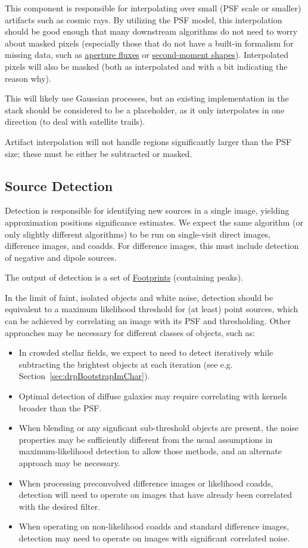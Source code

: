This component is responsible for interpolating over small (PSF scale or smaller) artifacts such as cosmic rays.  By utilizing the PSF model, this interpolation should be good enough that many downstream algorithms do not need to worry about masked pixels (especially those that do not have a built-in formalism for missing data, such as \hyperref[sec:acAperturePhotometry]{aperture fluxes} or \hyperref[sec:acShapeAlgorithms]{second-moment shapes}).  Interpolated pixels will also be masked (both as interpolated and with a bit indicating the reason why).

This will likely use Gaussian processes, but an existing implementation in the stack should be considered to be a placeholder, as it only interpolates in one direction (to deal with satellite trails).

Artifact interpolation will not handle regions significantly larger than the PSF size; these must be either be subtracted or masked.


\subsection{Source Detection}
\label{sec:acSourceDetection}

Detection is responsible for identifying new sources in a single image, yielding approximation positions significance estimates.  We expect the same algorithm (or only slightly different algorithms) to be run on single-visit direct images, difference images, and coadds.  For difference images, this must include detection of negative and dipole sources.

The output of detection is a set of \hyperref[sec:spFootprints]{Footprints} (containing peaks).

In the limit of faint, isolated objects and white noise, detection should be equivalent to a maximum likelihood threshold for (at least) point sources, which can be achieved by correlating an image with its PSF and thresholding.  Other approaches may be necessary for different classes of objects, such as:
\begin{itemize}
  \item In crowded stellar fields, we expect to need to detect iteratively while subtracting the brightest objects at each iteration (see e.g. Section~\ref{sec:drpBootstrapImChar}).
  \item Optimal detection of diffuse galaxies may require correlating with kernels broader than the PSF.
  \item When blending or any signficant sub-threshold objects are present, the noise properties may be sufficiently different from the usual assumptions in maximum-likelihood detection to allow those methods, and an alternate approach may be necessary.
  \item When processing preconvolved difference images or likelihood coadds, detection will need to operate on images that have already been correlated with the desired filter.
  \item When operating on non-likelihood coadds and standard difference images, detection may need to operate on images with significant correlated noise.
\end{itemize}

